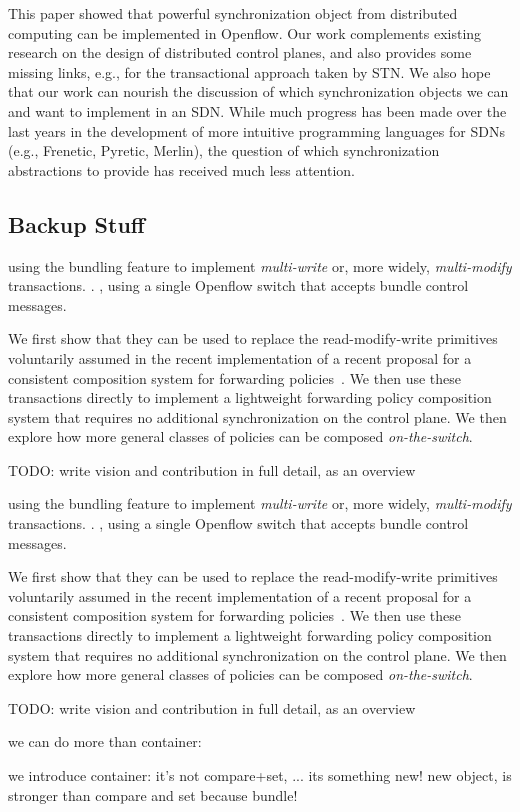 \documentclass[conference]{sigcomm-alternate}
\begin{document}
This paper showed that powerful synchronization object
from distributed computing can be implemented in Openflow.
Our work complements existing research on the design of
distributed control planes, and also provides some missing links,
e.g., for the transactional approach taken by STN.
We also hope that our work can nourish the discussion of
which synchronization objects we can and want to implement
in an SDN. While much progress has been made over the
last years in the development of more intuitive programming
languages for SDNs (e.g., Frenetic, Pyretic, Merlin), the
question of which synchronization abstractions to provide
has received much less attention.


{

}

\begin{appendix}

\section{Backup Stuff}

using the bundling feature to implement \emph{multi-write} or, more
widely, \emph{multi-modify} transactions. .
, using a single Openflow switch that accepts
bundle control messages.

We first show that they can be used to replace the read-modify-write
primitives voluntarily assumed in the recent implementation of a
recent proposal for a consistent composition system for forwarding policies~\cite{cpc}.
We then use these transactions directly to implement a lightweight
forwarding policy composition system that requires no additional
synchronization on the control plane.
We then explore how more general classes of policies can be composed
\emph{on-the-switch}.

TODO: write vision and contribution in full detail, as an overview


using the bundling feature to implement \emph{multi-write} or, more
widely, \emph{multi-modify} transactions. .
, using a single Openflow switch that accepts
bundle control messages.

We first show that they can be used to replace the read-modify-write
primitives voluntarily assumed in the recent implementation of a
recent proposal for a consistent composition system for forwarding policies~\cite{cpc}.
We then use these transactions directly to implement a lightweight
forwarding policy composition system that requires no additional
synchronization on the control plane.
We then explore how more general classes of policies can be composed
\emph{on-the-switch}.

TODO: write vision and contribution in full detail, as an overview

we can do more than container:

we introduce container: it's not compare+set, ... its something new!
new object, is stronger than compare and set because bundle!


\end{appendix}
\end{document}
